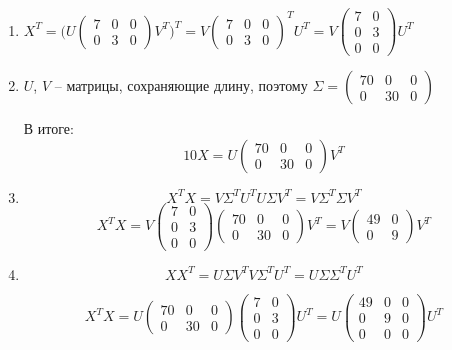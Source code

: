 \documentclass[12pt]{article} %
\theoremstyle{definition} %
\begin{document}
\begin{enumerate}
\item $X^T = \Big( U\begin{pmatrix}
7 & 0 & 0 \\
0 & 3 & 0
\end{pmatrix} V^T\Big)^T=V\begin{pmatrix}
7 & 0 & 0 \\
0 & 3 & 0
\end{pmatrix}^T U^T = 
V\begin{pmatrix}
7 & 0  \\
0 & 3  \\
0 & 0
\end{pmatrix} U^T$
\item $U$, $V$ -- матрицы, сохраняющие длину, поэтому
$\Sigma = \begin{pmatrix}
70 & 0 & 0 \\
0 & 30 & 0
\end{pmatrix}$

В итоге:
\[10X= U\begin{pmatrix}
70 & 0 & 0 \\
0 & 30 & 0
\end{pmatrix} V^T
\]

\item 
\[X^TX= V \Sigma^T U^T U \Sigma V^T= V \Sigma^T \Sigma V^T
\]
\[X^TX  = V\begin{pmatrix}
7 & 0  \\
0 & 3  \\
0 & 0
\end{pmatrix} \begin{pmatrix}
70 & 0 & 0 \\
0 & 30 & 0
\end{pmatrix} V^T=
V\begin{pmatrix}
49 & 0  \\
0 & 9  
\end{pmatrix}  V^T
\]


\item \[XX^T= U \Sigma V^T V \Sigma^T U^T = U \Sigma \Sigma^T U^T
\]

\[ X^TX =U\begin{pmatrix}
70 & 0 & 0 \\
0 & 30 & 0
\end{pmatrix} \begin{pmatrix}
7 & 0  \\
0 & 3  \\
0 & 0
\end{pmatrix} U^T =
U\begin{pmatrix}
49 & 0 & 0 \\
0 & 9 & 0 \\
0 & 0 & 0 
\end{pmatrix} U^T 
\]
\end{enumerate}
\end{document}
